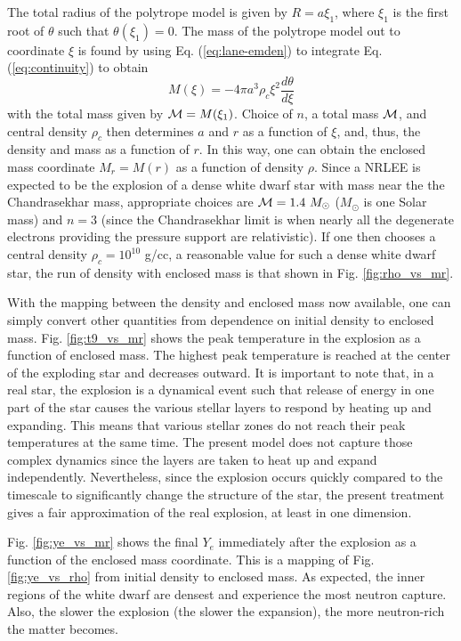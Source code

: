 \documentclass[preprint]{revtex4-2}
\begin{document}
The total radius of the polytrope model is given by $R = a \xi_1$,
where $\xi_1$ is the first root of $\theta$ such that $\theta(\xi_1) = 0$.
The mass of the polytrope model out to coordinate $\xi$ is found by
using Eq. (\ref{eq:lane-emden}) to
integrate Eq. (\ref{eq:continuity}) to obtain
\begin{equation}
M(\xi) = -4 \pi a^3\rho_c \xi^2 \frac{d\theta}{d\xi}
\label{eq:m_xi}
\end{equation}
with the total mass given by ${\cal M} = M(\xi_1)$.  Choice of $n$,
a total mass $\cal{M}$, and central density $\rho_c$ then determines $a$ and
$r$ as a function of $\xi$, and, thus, the density
and mass as a function of $r$.  In this way, one can obtain the enclosed
mass coordinate $M_r = M(r)$ as a function of density $\rho$.
Since a NRLEE is expected to be the explosion of a dense white dwarf star
with mass near the the Chandrasekhar mass, appropriate choices are
${\cal M} = 1.4\ M_\odot$ ($M_\odot$ is one Solar mass) and $n = 3$ (since
the Chandrasekhar limit is when nearly all the degenerate electrons 
providing the pressure support are relativistic).  If one then chooses
a central density $\rho_c = 10^{10}$ g/cc, a reasonable value for such a
dense white dwarf star, the run of density with enclosed mass is that shown
in Fig. \ref{fig:rho_vs_mr}.

With the mapping between the density and enclosed mass now available, one
can simply convert other quantities from dependence on initial density to
enclosed mass.  Fig. \ref{fig:t9_vs_mr} shows the peak temperature in the
explosion as a function of enclosed mass.  The highest peak temperature is
reached at the center of the exploding star and decreases outward.  It is
important to note that, in a real star, the explosion is a dynamical
event such that release of energy
in one part of the star causes the
various stellar layers to respond by heating up and expanding.  This means
that various stellar zones do not reach their peak temperatures at the same
time.  The present model does not capture those complex dynamics
since the layers are taken to heat up and expand independently.  Nevertheless,
since the explosion occurs quickly compared to the timescale to significantly
change the structure of the star, the present treatment gives a fair
approximation of the real explosion, at least in one dimension.

Fig. \ref{fig:ye_vs_mr} shows the final $Y_e$ immediately after the
explosion as a function of the enclosed mass coordinate.  This is a mapping
of Fig. \ref{fig:ye_vs_rho} from initial density to enclosed mass.
As expected, the inner regions of the white dwarf are densest and experience
the most neutron capture.  Also, the slower the explosion (the slower the
expansion), the more neutron-rich the matter becomes.
\end{document}
